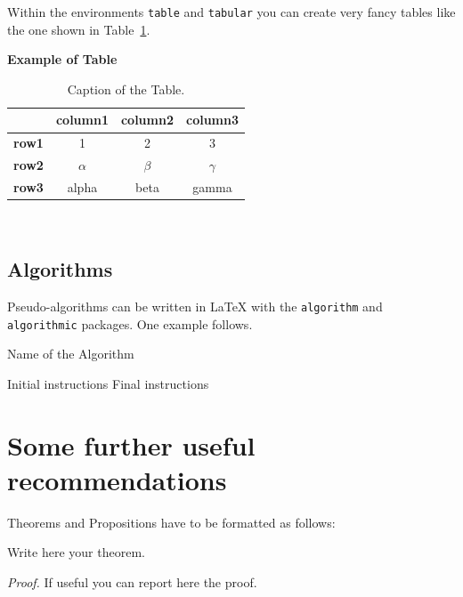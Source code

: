 \documentclass[11pt,a4paper,twocolumn]{article}
\begin{document}
Within the environments \texttt{table} and  \texttt{tabular} you can create very fancy tables like the one shown in Table~\ref{table:example}.
\begin{table}[H]
    \caption*{\textbf{Example of Table}}
    \centering 
    \begin{tabular}{|p{3em} c c c |}
    \hline
    \rowcolor{bluePoli!40}
     & \textbf{column1} & \textbf{column2} & \textbf{column3} \T\B \\
    \hline \hline
    \textbf{row1} & 1 & 2 & 3 \T\B \\
    \textbf{row2} & $\alpha$ & $\beta$ & $\gamma$ \T\B\\
    \textbf{row3} & alpha & beta & gamma \B\\
    \hline
    \end{tabular}
    \\[10pt]
    \caption{Caption of the Table.}
    \label{table:example}
\end{table}

\subsection{Algorithms}
\label{subsec:algorithms}

Pseudo-algorithms can be written in \LaTeX{} with the \texttt{algorithm} and \texttt{algorithmic} packages.
One example follows.
\begin{algorithm}[H]
\label{alg:example}
\caption{Name of the Algorithm}
\label{alg:var}
\label{protocol1}
\begin{algorithmic}[1]
\STATE Initial instructions
\ENDIF
\ENDFOR
{}
\ENDWHILE
\STATE Final instructions
\end{algorithmic}
\end{algorithm} 

\section{Some further useful recommendations}

Theorems and Propositions have to be formatted as follows:
\begin{theorem}
\label{a_theorem}
Write here your theorem. 
\end{theorem}
\textit{Proof.} If useful you can report here the proof.
\vspace{0.3cm} %
\end{document}
